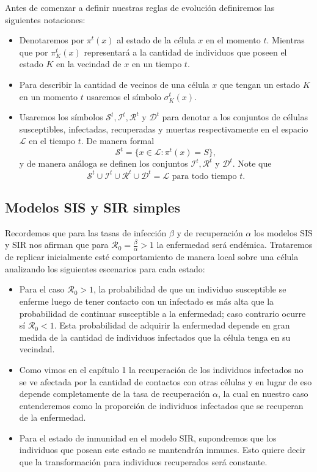 Antes de comenzar a definir nuestras reglas de evolución definiremos las siguientes notaciones:
\begin{itemize}
    \item Denotaremos por $\pi^t(x)$ al estado de la célula $x$ en el momento $t$. Mientras que por $\pi_K^t(x)$ representará a la cantidad de individuos que poseen el estado $K$ en la vecindad de $x$ en un tiempo $t$.
    \item Para describir la cantidad de vecinos de una célula $x$ que tengan un estado $K$ en un momento $t$ usaremos el símbolo $\sigma_K^t(x)$.
    \item Usaremos los símbolos $\mathcal{S}^t,\mathcal{I}^t,\mathcal{R}^t$ y $\mathcal{D}^t$ para denotar a los conjuntos de células susceptibles, infectadas, recuperadas y muertas respectivamente en el espacio $\mathcal{L}$ en el tiempo $t$. De manera formal
    $$\mathcal{S}^t=\{x\in\mathcal{L}:\pi^t(x)=S\},$$
    y de manera análoga se definen los conjuntos $\mathcal{I}^t,\mathcal{R}^t$ y $\mathcal{D}^t$. Note que $$\mathcal{S}^t\cup\mathcal{I}^t\cup\mathcal{R}^t\cup\mathcal{D}^t=\mathcal{L}\text{ para todo tiempo }t.$$
\end{itemize}

\subsection{Modelos SIS y SIR simples}

Recordemos que para las tasas de infección $\beta$ y de recuperación $\alpha$ los modelos SIS y SIR nos afirman que para $\mathcal{R}_0=\frac{\beta}{\alpha}>1$ la enfermedad será endémica. Trataremos de replicar inicialmente esté comportamiento de manera local sobre una célula analizando los siguientes escenarios para cada estado:

\begin{itemize}
    \item Para el caso $\mathcal{R}_0>1$, la probabilidad de que un individuo susceptible se enferme luego de tener contacto con un infectado es más alta que la probabilidad de continuar susceptible a la enfermedad; caso contrario ocurre sí $\mathcal{R}_0<1$. Esta probabilidad de adquirir la enfermedad depende en gran medida de la cantidad de individuos infectados que la célula tenga en su vecindad. 
    
    \item Como vimos en el capítulo 1 la recuperación de los individuos infectados no se ve afectada por la cantidad de contactos con otras células y en lugar de eso depende completamente de la tasa de recuperación $\alpha$, la cual en nuestro caso entenderemos como la proporción de individuos infectados que se recuperan de la enfermedad.
    
    \item Para el estado de inmunidad en el modelo SIR, supondremos que los individuos que posean este estado se mantendrán inmunes. Esto quiere decir que la transformación para individuos recuperados será constante.
\end{itemize}

